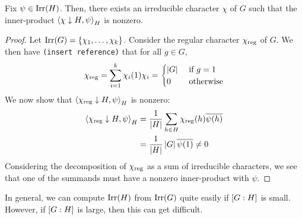 \begin{proposition}
    Fix $\psi \in \operatorname{Irr}\!\left( H \right)$. Then, there exists an irreducible character $\chi$ of $G$ such that the inner-product $\left\langle \chi \downarrow H, \psi \right\rangle_H$ is nonzero. 
\end{proposition}
\begin{proof}
    Let $\operatorname{Irr}\!\left( G \right) = \left\{ \chi_1, \ldots, \chi_k \right\}$. Consider the regular character $\chi_{\operatorname{reg}}$ of $G$. We then have \verb|(insert reference)| that for all $g \in G$,
    \begin{align*}
        \chi_{\operatorname{reg}} = \sum_{i = 1}^k \chi_i(1) \chi_i
        = \begin{cases}
            \left\lvert G \right\rvert & \text{ if } g = 1 \\
            0 & \text{ otherwise}
        \end{cases}
    \end{align*}
    We now show that $\left\langle \chi_{\operatorname{reg}} \downarrow H, \psi \right\rangle_H$ is nonzero:
    \begin{align*}
        \left\langle \chi_{\operatorname{reg}} \downarrow H, \psi \right\rangle_H &= \frac{1}{\left\lvert H \right\rvert} \sum_{h \in H} \chi_{\operatorname{reg}}(h) \overline{\psi(h)} \\
        &= \frac{1}{\left\lvert H \right\rvert} \left\lvert G \right\rvert \overline{\psi(1)} \neq 0
    \end{align*}
    Considering the decomposition of $\chi_{\operatorname{reg}}$ as a sum of irreducible characters, we see that one of the summands must have a nonzero inner-product with $\psi$.
\end{proof}

\begin{remark}
    In general, we can compute $\operatorname{Irr}\!\left( H \right)$ from $\operatorname{Irr}\!\left( G \right)$ quite easily if $\left[ G : H \right]$ is small. However, if $\left[ G : H \right]$ is large, then this can get difficult.
\end{remark}

